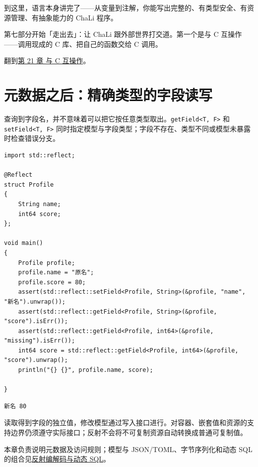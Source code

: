 到这里，语言本身讲完了——从变量到注解，你能写出完整的、有类型安全、有资源管理、有抽象能力的 ChaLi 程序。

第七部分开始「走出去」：让 ChaLi 跟外部世界打交道。第一个是与 C 互操作——调用现成的 C 库、把自己的函数交给 C 调用。

翻到\hyperref[ch:21]{第 21 章 与 C 互操作}。

\section{元数据之后：精确类型的字段读写}

查询到字段名，并不意味着可以把它按任意类型取出。\texttt{get\allowbreak{}Field<\allowbreak{}T,\allowbreak{} F>\allowbreak{}} 和 \texttt{set\allowbreak{}Field<\allowbreak{}T,\allowbreak{} F>\allowbreak{}} 同时指定模型与字段类型；字段不存在、类型不同或模型未暴露时检查错误分支。

\par
\medskip
\begin{lstlisting}[style=chali]
import std::reflect;

@Reflect
struct Profile
{
    String name;
    int64 score;
};

void main()
{
    Profile profile;
    profile.name = "原名";
    profile.score = 80;
    assert(std::reflect::setField<Profile, String>(&profile, "name", "新名").unwrap());
    assert(std::reflect::getField<Profile, String>(&profile, "score").isErr());
    assert(std::reflect::getField<Profile, int64>(&profile, "missing").isErr());
    int64 score = std::reflect::getField<Profile, int64>(&profile, "score").unwrap();
    println("{} {}", profile.name, score);

}
\end{lstlisting}
\par
\medskip

\par
\medskip
\begin{lstlisting}[style=out]
新名 80
\end{lstlisting}
\par
\medskip

读取得到字段的独立值，修改模型通过写入接口进行。对容器、嵌套值和资源的支持边界仍须遵守实际接口；反射不会将不可复制资源自动转换成普通可复制值。

本章负责说明元数据及访问规则；模型与 JSON/TOML、字节序列化和动态 SQL 的组合见\href{https://gitee.com/rabbitc999/chali/blob/master/doc/36-reflection-serialization-sql.md}{反射编解码与动态 SQL}。

